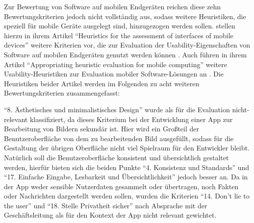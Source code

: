 \noindent
Zur Bewertung von Software auf mobilen Endgeräten reichen diese zehn Bewertungskriterien jedoch nicht vollständig aus, sodass weitere Heuristiken, die speziell für mobile Geräte ausgelegt sind, hinzugezogen werden sollen.
\citeauthor{MachadoNeto13} stellen hierzu in ihrem Artikel ``Heuristics for the assessment of interfaces of mobile devices'' weitere Kriterien vor, die zur Evaluation der Usability-Eigenschaften von Software auf mobilen Endgeräten genutzt werden können \citep[Seite 95]{MachadoNeto13}.
Auch \citeauthor{Bertini09} führen in ihrem Artikel ``Appropriating heuristic evaluation for mobile computing'' weitere Usability-Heuristiken zur Evaluation mobiler Software-Lösungen an \citep[Seite 20--41]{Bertini09}.
Die Heuristiken beider Artikel werden im Folgenden zu acht weiteren Bewertungskriterien zusammengefasst:

\begin{enumerate}
    \setcounter{enumi}{10}
\end{enumerate}

\noindent
``8. Ästhetisches und minimalistisches Design'' wurde als für die Evaluation nicht-relevant klassifiziert, da dieses Kriterium bei der Entwicklung einer App zur Bearbeitung von Bildern sekundär ist.
Hier wird ein Großteil der Benutzeroberfläche von dem zu bearbeitenden Bild ausgefüllt, sodass für die Gestaltung der übrigen Oberfläche nicht viel Spielraum für den Entwickler bleibt.
Natürlich soll die Benutzeroberfläche konsistent und übersichtlich gestaltet werden, hierfür bieten sich die beiden Punkte ``4. Konsistenz und Standards'' und ``17. Einfache Eingabe, Lesbarkeit und Übersichtlichkeit'' jedoch besser an.
Da in der App weder sensible Nutzerdaten gesammelt oder übertragen, noch Fakten oder Nachrichten dargestellt werden sollen, wurden die Kriterien ``14. Don't lie to the user'' und ``18. Stelle Privatheit sicher'' nach Absprache mit der Geschäftsleitung als für den Kontext der App nicht relevant gewichtet.


